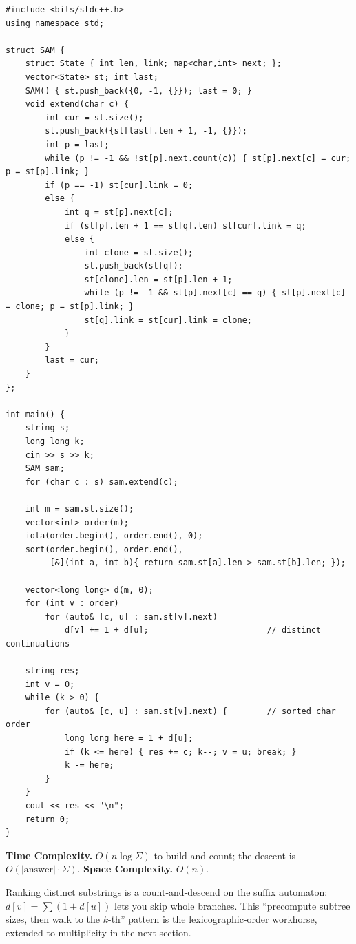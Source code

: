 \begin{lstlisting}
#include <bits/stdc++.h>
using namespace std;

struct SAM {
    struct State { int len, link; map<char,int> next; };
    vector<State> st; int last;
    SAM() { st.push_back({0, -1, {}}); last = 0; }
    void extend(char c) {
        int cur = st.size();
        st.push_back({st[last].len + 1, -1, {}});
        int p = last;
        while (p != -1 && !st[p].next.count(c)) { st[p].next[c] = cur; p = st[p].link; }
        if (p == -1) st[cur].link = 0;
        else {
            int q = st[p].next[c];
            if (st[p].len + 1 == st[q].len) st[cur].link = q;
            else {
                int clone = st.size();
                st.push_back(st[q]);
                st[clone].len = st[p].len + 1;
                while (p != -1 && st[p].next[c] == q) { st[p].next[c] = clone; p = st[p].link; }
                st[q].link = st[cur].link = clone;
            }
        }
        last = cur;
    }
};

int main() {
    string s;
    long long k;
    cin >> s >> k;
    SAM sam;
    for (char c : s) sam.extend(c);

    int m = sam.st.size();
    vector<int> order(m);
    iota(order.begin(), order.end(), 0);
    sort(order.begin(), order.end(),
         [&](int a, int b){ return sam.st[a].len > sam.st[b].len; });

    vector<long long> d(m, 0);
    for (int v : order)
        for (auto& [c, u] : sam.st[v].next)
            d[v] += 1 + d[u];                        // distinct continuations

    string res;
    int v = 0;
    while (k > 0) {
        for (auto& [c, u] : sam.st[v].next) {        // sorted char order
            long long here = 1 + d[u];
            if (k <= here) { res += c; k--; v = u; break; }
            k -= here;
        }
    }
    cout << res << "\n";
    return 0;
}
\end{lstlisting}

\begin{complexitybox}
\textbf{Time Complexity.} $O(n\log\Sigma)$ to build and count; the descent
is $O(|\text{answer}|\cdot\Sigma)$. \textbf{Space Complexity.} $O(n)$.
\end{complexitybox}

\begin{takeawaybox}
Ranking distinct substrings is a count-and-descend on the suffix
automaton: $d[v]=\sum(1+d[u])$ lets you skip whole branches. This
``precompute subtree sizes, then walk to the $k$-th'' pattern is the
lexicographic-order workhorse, extended to multiplicity in the next
section.
\end{takeawaybox}
